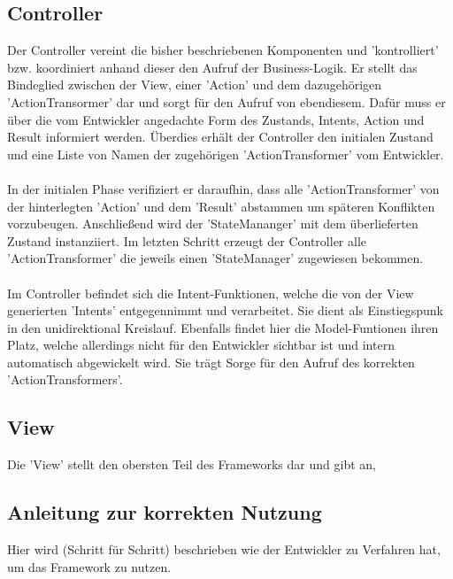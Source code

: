 \subsection{Controller}
Der Controller vereint die bisher beschriebenen Komponenten und 'kontrolliert' bzw. koordiniert anhand dieser den Aufruf der Business-Logik. Er stellt das Bindeglied zwischen der View, einer 'Action' und dem dazugehörigen 'ActionTransormer' dar und sorgt für den Aufruf von ebendiesem. Dafür muss er über die vom Entwickler angedachte Form des Zustands, Intents, Action und Result informiert werden. Überdies erhält der Controller den initialen Zustand und eine Liste von Namen der zugehörigen 'ActionTransformer' vom Entwickler.
\\\\
In der initialen Phase verifiziert er daraufhin, dass alle 'ActionTransformer' von der hinterlegten 'Action' und dem 'Result' abstammen um späteren Konflikten vorzubeugen. Anschließend wird der 'StateMananger' mit dem überlieferten Zustand instanziiert. Im letzten Schritt erzeugt der Controller alle 'ActionTransformer' die jeweils einen 'StateManager' zugewiesen bekommen.
\\\\
Im Controller befindet sich die Intent-Funktionen, welche die von der View generierten 'Intents' entgegennimmt und verarbeitet. Sie dient als Einstiegspunk in den unidirektional Kreislauf. Ebenfalls findet hier die Model-Funtionen ihren Platz, welche allerdings nicht für den Entwickler sichtbar ist und intern automatisch abgewickelt wird. Sie trägt Sorge für den Aufruf des korrekten 'ActionTransformers'. 

\subsection{View}
Die 'View' stellt den obersten Teil des Frameworks dar und gibt an, 

\subsection{Anleitung zur korrekten Nutzung}
Hier wird (Schritt für Schritt) beschrieben wie der Entwickler zu Verfahren hat, um das Framework zu nutzen.